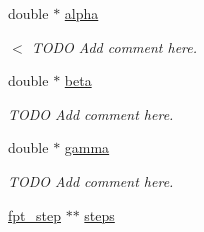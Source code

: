 \begin{CompactItemize}
double $\ast$ \hyperlink{structfpt__data_e132db4edcdbf60c1f61760e3f595259}{alpha}
\begin{CompactList}\small\item\em $<$ TODO Add comment here. \item\end{CompactList}\item 
double $\ast$ \hyperlink{structfpt__data_ba9cfecd384591c476464842ed5ddb2d}{beta}
\begin{CompactList}\small\item\em TODO Add comment here. \item\end{CompactList}\item 
double $\ast$ \hyperlink{structfpt__data_44795aeed3218709fa139025fcd22451}{gamma}
\begin{CompactList}\small\item\em TODO Add comment here. \item\end{CompactList}\item 
\hypertarget{structfpt__data_97bccf61367adec92d3fd83abd7a43d2}{
\hyperlink{structfpt__step}{fpt\_\-step} $\ast$$\ast$ \hyperlink{structfpt__data_97bccf61367adec92d3fd83abd7a43d2}{steps}}
\label{structfpt__data_97bccf61367adec92d3fd83abd7a43d2}


\end{CompactItemize}
